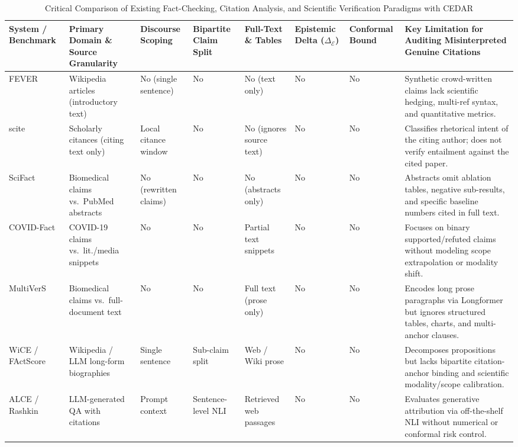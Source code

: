 \documentclass[journal]{IEEEtran}
\begin{document}
\begin{table}[t]
\centering
\footnotesize
\caption{Critical Comparison of Existing Fact-Checking, Citation Analysis, and Scientific Verification Paradigms with CEDAR}
\label{tab:literature_comparison}
\renewcommand{\arraystretch}{1.14}
\begin{tabularx}{\textwidth}{L{2.6cm} L{2.2cm} C{1.4cm} C{1.5cm} C{1.5cm} C{1.5cm} C{1.4cm} Y}
\toprule
\textbf{System / Benchmark} & \textbf{Primary Domain \& Source Granularity} & \textbf{Discourse Scoping} & \textbf{Bipartite Claim Split} & \textbf{Full-Text \& Tables} & \textbf{Epistemic Delta ($\Delta_{\mathcal{E}}$)} & \textbf{Conformal Bound} & \textbf{Key Limitation for Auditing Misinterpreted Genuine Citations} \\
\midrule
FEVER \cite{thorne2018fever} & Wikipedia articles (introductory text) & No (single sentence) & No & No (text only) & No & No & Synthetic crowd-written claims lack scientific hedging, multi-ref syntax, and quantitative metrics. \\
scite \cite{nicholson2021scite} & Scholarly citances (citing text only) & Local citance window & No & No (ignores source text) & No & No & Classifies rhetorical intent of the citing author; does not verify entailment against the cited paper. \\
SciFact \cite{wadden2020fact} & Biomedical claims vs.\ PubMed abstracts & No (rewritten claims) & No & No (abstracts only) & No & No & Abstracts omit ablation tables, negative sub-results, and specific baseline numbers cited in full text. \\
COVID-Fact \cite{saakyan2021covidfact} & COVID-19 claims vs.\ lit./media snippets & No & No & Partial text snippets & No & No & Focuses on binary supported/refuted claims without modeling scope extrapolation or modality shift. \\
MultiVerS \cite{wadden2022multivers} & Biomedical claims vs.\ full-document text & No & No & Full text (prose only) & No & No & Encodes long prose paragraphs via Longformer but ignores structured tables, charts, and multi-anchor clauses. \\
WiCE \cite{kamoi2023wice} / FActScore \cite{min2023factscore} & Wikipedia / LLM long-form biographies & Single sentence & Sub-claim split & Web / Wiki prose & No & No & Decomposes propositions but lacks bipartite citation-anchor binding and scientific modality/scope calibration. \\
ALCE \cite{gao2023enabling} / Rashkin \cite{rashkin2023measuring} & LLM-generated QA with citations & Prompt context & Sentence-level NLI & Retrieved web passages & No & No & Evaluates generative attribution via off-the-shelf NLI without numerical or conformal risk control. \\

\end{tabularx}
\end{table}
\end{document}
